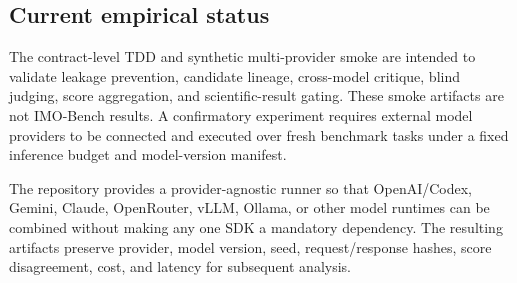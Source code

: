 \subsection{Current empirical status}

The contract-level TDD and synthetic multi-provider smoke are intended to validate leakage prevention, candidate lineage, cross-model critique, blind judging, score aggregation, and scientific-result gating. These smoke artifacts are not IMO-Bench results. A confirmatory experiment requires external model providers to be connected and executed over fresh benchmark tasks under a fixed inference budget and model-version manifest.

The repository provides a provider-agnostic runner so that OpenAI/Codex, Gemini, Claude, OpenRouter, vLLM, Ollama, or other model runtimes can be combined without making any one SDK a mandatory dependency. The resulting artifacts preserve provider, model version, seed, request/response hashes, score disagreement, cost, and latency for subsequent analysis.
